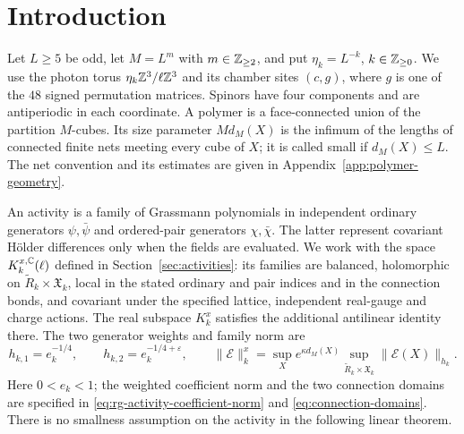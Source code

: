 \begin{abstract}
We study local Grassmann interactions on the three-dimensional
chamber lattice, with independent ordinary and covariant-difference
generators. Under explicit small-field and charge bounds, vacuum
and scalar mass extraction followed by a shortest-chain adjustment
makes the full ordinary quadratic kernel vanish at zero connection
on small polymers.
Scaling and reblocking give an explicit norm bound that is
contractive for sufficiently large block scale and sufficiently
small charge.
The low-degree gain follows from local gauge representatives with
an analytic disk of radius \(L^{7/4}\). We also prove a local
reconstruction estimate, uniform in the lattice mesh, using
cancellation in the averaged chamber Dirac operator.
\end{abstract}
\maketitle
\tableofcontents
\section{Introduction}
\label{sec:introduction}

Let \(L\ge5\) be odd, let \(M=L^m\) with \(m\in\mathbb Z_{\ge2}\), and put
\(\eta_k=L^{-k}\), \(k\in\mathbb Z_{\ge0}\). We use the photon torus
\(\eta_k\mathbb Z^3/\ell\mathbb Z^3\) and its chamber sites \((c,g)\), where \(g\)
is one of the \(48\) signed permutation matrices. Spinors have four
components and are antiperiodic in each coordinate. A polymer is a
face-connected union of the partition \(M\)-cubes. Its size parameter
\(Md_M(X)\) is the infimum of the lengths of connected finite nets
meeting every cube of \(X\); it is called small if \(d_M(X)\le L\).
The net convention and its estimates are given in
Appendix~\ref{app:polymer-geometry}.

An activity is a family of Grassmann polynomials in independent
ordinary generators \(\psi,\bar\psi\) and ordered-pair generators
\(\chi,\bar\chi\). The latter represent covariant H\"older differences
only when the fields are evaluated. We work with the space
\(K_k^{x,\mathbb C}(\ell)\) defined in
Section~\ref{sec:activities}: its families are balanced, holomorphic
on \(\widetilde R_k\times\mathfrak X_k\), local in the stated
ordinary and pair indices and in the connection bonds, and covariant
under the specified lattice, independent real-gauge and charge
actions. The real subspace \(K_k^x\) satisfies the additional
antilinear identity there. The two generator weights and family norm are
\[
 h_{k,1}=e_k^{-1/4},\qquad h_{k,2}=e_k^{-1/4+\varepsilon},\qquad
 \|\mathscr E\|_k^x
 =\sup_X e^{\kappa d_M(X)}
   \sup_{\widetilde R_k\times\mathfrak X_k}
                 \|\mathscr E(X)\|_{h_k}.
\]
Here \(0<e_k<1\); the weighted coefficient norm and the two
connection domains are specified in
\eqref{eq:rg-activity-coefficient-norm} and
\eqref{eq:connection-domains}. There is no smallness assumption
on the activity in the following linear theorem.

